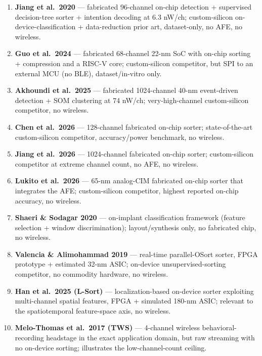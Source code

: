 \documentclass[11pt]{article}
\begin{document}
\begin{enumerate}[nosep]
\item \textbf{Jiang et al.\ 2020} --- fabricated 96-channel on-chip detection + supervised decision-tree sorter + intention decoding at 6.3 nW/ch; custom-silicon on-device-classification + data-reduction prior art, dataset-only, no AFE, no wireless.
\item \textbf{Guo et al.\ 2024} --- fabricated 68-channel 22-nm SoC with on-chip sorting + compression and a RISC-V core; custom-silicon competitor, but SPI to an external MCU (no BLE), dataset/in-vitro only.
\item \textbf{Akhoundi et al.\ 2025} --- fabricated 1024-channel 40-nm event-driven detection + SOM clustering at 74 nW/ch; very-high-channel custom-silicon competitor, no wireless.
\item \textbf{Chen et al.\ 2026} --- 128-channel fabricated on-chip sorter; state-of-the-art custom-silicon competitor, accuracy/power benchmark, no wireless.
\item \textbf{Jiang et al.\ 2026} --- 1024-channel fabricated on-chip sorter; custom-silicon competitor at extreme channel count, no AFE, no wireless.
\item \textbf{Lukito et al.\ 2026} --- 65-nm analog-CIM fabricated on-chip sorter that integrates the AFE; custom-silicon competitor, highest reported on-chip accuracy, no wireless.
\item \textbf{Shaeri \& Sodagar 2020} --- on-implant classification framework (feature selection + window discrimination); layout/synthesis only, no fabricated chip, no wireless.
\item \textbf{Valencia \& Alimohammad 2019} --- real-time parallel-OSort sorter, FPGA prototype + estimated 32-nm ASIC; on-device unsupervised-sorting competitor, no commodity hardware, no wireless.
\item \textbf{Han et al.\ 2025 (L-Sort)} --- localization-based on-device sorter exploiting multi-channel spatial features, FPGA + simulated 180-nm ASIC; relevant to the spatiotemporal feature-space axis, no wireless.
\item \textbf{Melo-Thomas et al.\ 2017 (TWS)} --- 4-channel wireless behavioral-recording headstage in the exact application domain, but raw streaming with no on-device sorting; illustrates the low-channel-count ceiling.
\end{enumerate}
\end{document}

